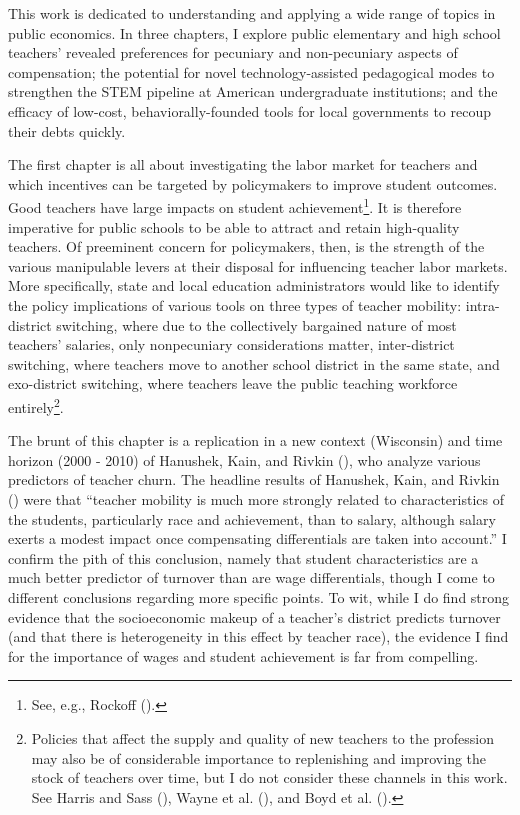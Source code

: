 This work is dedicated to understanding and applying a wide range of topics in public economics. In three chapters, I explore public elementary and high school teachers' revealed preferences for pecuniary and non-pecuniary aspects of compensation; the potential for novel technology-assisted pedagogical modes to strengthen the STEM pipeline at American undergraduate institutions; and the efficacy of low-cost, behaviorally-founded tools for local governments to recoup their debts quickly. 

The first chapter is all about investigating the labor market for teachers and which incentives can be targeted by policymakers to improve student outcomes. Good teachers have large impacts on student achievement\footnote{See,
  e.g., Rockoff (\citeyearpar{rockoff}).}. It is
therefore imperative for public schools to be able to attract and retain
high-quality teachers. Of preeminent concern for policymakers, then, is
the strength of the various manipulable levers at their disposal for
influencing teacher labor markets. More specifically, state and local
education administrators would like to identify the policy implications
of various tools on three types of teacher mobility: intra-district
switching, where due to the collectively bargained nature of most
teachers' salaries, only nonpecuniary considerations matter,
inter-district switching, where teachers move to another school district
in the same state, and exo-district switching, where teachers leave the
public teaching workforce entirely\footnote{Policies that affect the
  supply and quality of new teachers to the profession may also be of
  considerable importance to replenishing and improving the stock of
  teachers over time, but I do not consider these channels in this
  work. See Harris and Sass (\citeyearpar{harris}),
  Wayne et al. (\citeyearpar{wayne}), and Boyd et al.
  (\citeyearpar{boyd2009}).}.

The brunt of this chapter is a replication in a new
context (Wisconsin) and time horizon (2000 - 2010) of Hanushek,
Kain, and Rivkin (\citeyearpar{hanushek}), who analyze various predictors of teacher churn. The headline results of Hanushek, Kain, and Rivkin (\citeyearpar{hanushek})
were that ``teacher mobility is much more strongly related to
characteristics of the students, particularly race and achievement, than
to salary, although salary exerts a modest impact once compensating
differentials are taken into account.'' I confirm the pith of this
conclusion, namely that student characteristics are a much better
predictor of turnover than are wage differentials, though I come to
different conclusions regarding more specific points. To wit, while I
do find strong evidence that the socioeconomic makeup of a teacher's
district predicts turnover (and that there is heterogeneity in this
effect by teacher race), the evidence I find for the importance of
wages and student achievement is far from compelling.

